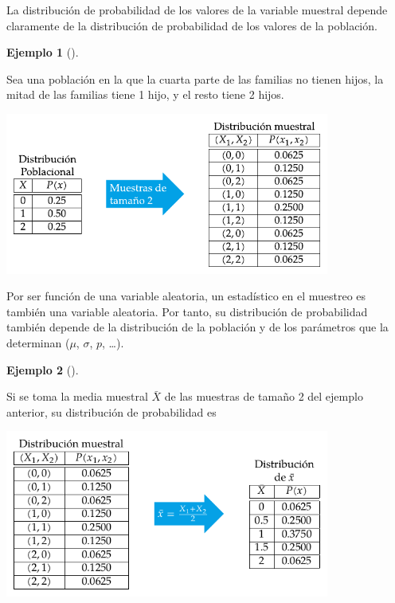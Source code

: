 \documentclass[
  a4paper,
]{scrreport}
\theoremstyle{plain}
\theoremstyle{definition}
\newtheorem{example}{Ejemplo}[chapter]
\theoremstyle{definition}
\theoremstyle{remark}
\begin{document}
La distribución de probabilidad de los valores de la variable muestral
depende claramente de la distribución de probabilidad de los valores de
la población.

\begin{example}[]\protect\hypertarget{exm-distribucion-muestral}{}\label{exm-distribucion-muestral}

Sea una población en la que la cuarta parte de las familias no tienen
hijos, la mitad de las familias tiene 1 hijo, y el resto tiene 2 hijos.

\begin{center}
\includegraphics[width=0.8\textwidth,height=\textheight]{img/estimacion/distribucion-variable-muestral.pdf}
\end{center}

\end{example}

Por ser función de una variable aleatoria, un estadístico en el muestreo
es también una variable aleatoria. Por tanto, su distribución de
probabilidad también depende de la distribución de la población y de los
parámetros que la determinan (\(\mu\), \(\sigma\), \(p\), \ldots).

\begin{example}[]\protect\hypertarget{exm-distribucion-media-muestral}{}\label{exm-distribucion-media-muestral}

Si se toma la media muestral \(\bar X\) de las muestras de tamaño 2 del
ejemplo anterior, su distribución de probabilidad es

\begin{center}
\includegraphics[width=0.8\textwidth,height=\textheight]{img/estimacion/distribucion-media.pdf}
\end{center}

\end{example}
\end{document}
